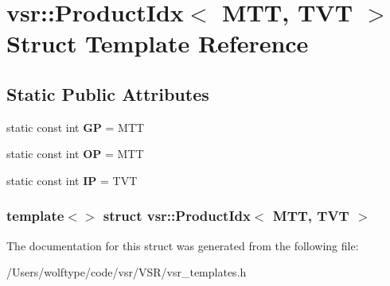 \hypertarget{structvsr_1_1_product_idx_3_01_m_t_t_00_01_t_v_t_01_4}{\section{vsr\-:\-:Product\-Idx$<$ M\-T\-T, T\-V\-T $>$ Struct Template Reference}
\label{structvsr_1_1_product_idx_3_01_m_t_t_00_01_t_v_t_01_4}
}
\subsection*{Static Public Attributes}
\begin{DoxyCompactItemize}
\item 
\hypertarget{structvsr_1_1_product_idx_3_01_m_t_t_00_01_t_v_t_01_4_a16deec993363219491c8820fda1355d7}{static const int {\bfseries G\-P} = M\-T\-T}\label{structvsr_1_1_product_idx_3_01_m_t_t_00_01_t_v_t_01_4_a16deec993363219491c8820fda1355d7}

\item 
\hypertarget{structvsr_1_1_product_idx_3_01_m_t_t_00_01_t_v_t_01_4_afdb0d8a13bda054478691fb1afcf6f46}{static const int {\bfseries O\-P} = M\-T\-T}\label{structvsr_1_1_product_idx_3_01_m_t_t_00_01_t_v_t_01_4_afdb0d8a13bda054478691fb1afcf6f46}

\item 
\hypertarget{structvsr_1_1_product_idx_3_01_m_t_t_00_01_t_v_t_01_4_a5a68ef56ba75ef9770e6986fd8c29522}{static const int {\bfseries I\-P} = T\-V\-T}\label{structvsr_1_1_product_idx_3_01_m_t_t_00_01_t_v_t_01_4_a5a68ef56ba75ef9770e6986fd8c29522}

\end{DoxyCompactItemize}
\subsubsection*{template$<$$>$ struct vsr\-::\-Product\-Idx$<$ M\-T\-T, T\-V\-T $>$}



The documentation for this struct was generated from the following file\-:\begin{DoxyCompactItemize}
\item 
/\-Users/wolftype/code/vsr/\-V\-S\-R/vsr\-\_\-templates.\-h\end{DoxyCompactItemize}
